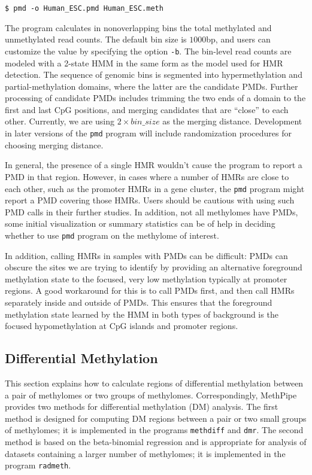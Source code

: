 \documentclass[10pt]{article}
\newcommand{\prog}[1]{\texttt{#1}}
\newcommand{\op}[1]{\texttt{#1}}
\begin{document}
\begin{verbatim}
$ pmd -o Human_ESC.pmd Human_ESC.meth
\end{verbatim}

The program calculates in nonoverlapping bins the total methylated and
unmethylated read counts. The default bin size is $1000$bp, and users
can customize the value by specifying the option \op{-b}. The bin-level read
counts are modeled with a 2-state HMM in the same form
as the model used for HMR detection. The sequence of genomic bins is
segmented into hypermethylation and partial-methylation domains, where
the latter are the candidate PMDs. Further processing of candidate
PMDs includes trimming the two ends of a domain to the first and last
CpG positions, and merging candidates that are ``close'' to each
other. Currently, we are using $2\times bin\_size$ as the merging
distance. Development in later versions of the \prog{pmd} program will
include randomization procedures for choosing merging distance. 

In general, the presence of a single HMR wouldn't cause the program to
report a PMD in that region. However, in cases where a number of HMRs
are close to each other, such as the promoter HMRs in a gene cluster,
the \prog{pmd} program might report a PMD covering those HMRs. Users
should be cautious with using such PMD calls in their further
studies. In addition, not all methylomes have PMDs, some initial
visualization or summary statistics can be of help in deciding whether
to use \prog{pmd} program on the methylome of interest.

In addition, calling HMRs in samples with PMDs can be difficult: PMDs
can obscure the sites we are trying to identify by providing an alternative
foreground methylation state to the focused, very low methylation typically
at promoter regions. A good workaround for this is to call PMDs first, and
then call HMRs separately inside and outside of PMDs. This ensures that
the foreground methylation state learned by the HMM in both types of background
is the focused hypomethylation at CpG islands and promoter regions.

\subsection{Differential Methylation}
\label{sec:differential_methylation}

This section explains how to calculate regions of differential methylation 
between a pair of methylomes or two groups of methylomes. Correspondingly, 
MethPipe provides two methods for differential methylation (DM) analysis. 
The first method is designed for computing DM regions between a pair or two 
small groups of methylomes; it is implemented in the programs \prog{methdiff} 
and \prog{dmr}. The second method is based on the beta-binomial 
regression and is appropriate for analysis of datasets containing a larger 
number of methylomes; it is implemented in the program \prog{radmeth}.
\end{document}
